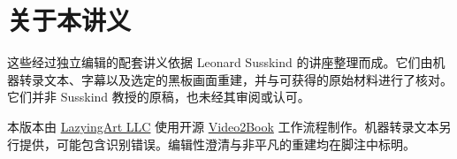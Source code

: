 \documentclass[11pt,oneside]{book}
\begin{document}
\frontmatter
\hypersetup{pageanchor=false}

\hypersetup{pageanchor=true}

\clearpage
\chapter*{关于本讲义}
这些经过独立编辑的配套讲义依据 Leonard Susskind 的讲座整理而成。它们由机器转录文本、字幕以及选定的黑板画面重建，并与可获得的原始材料进行了核对。它们并非 Susskind 教授的原稿，也未经其审阅或认可。

本版本由 \href{https://lazying.art}{LazyingArt LLC} 使用开源 \href{https://github.com/lachlanchen/Video2Book}{Video2Book} 工作流程制作。机器转录文本另行提供，可能包含识别错误。编辑性澄清与非平凡的重建均在脚注中标明。
\clearpage
\tableofcontents
\mainmatter










\end{document}
